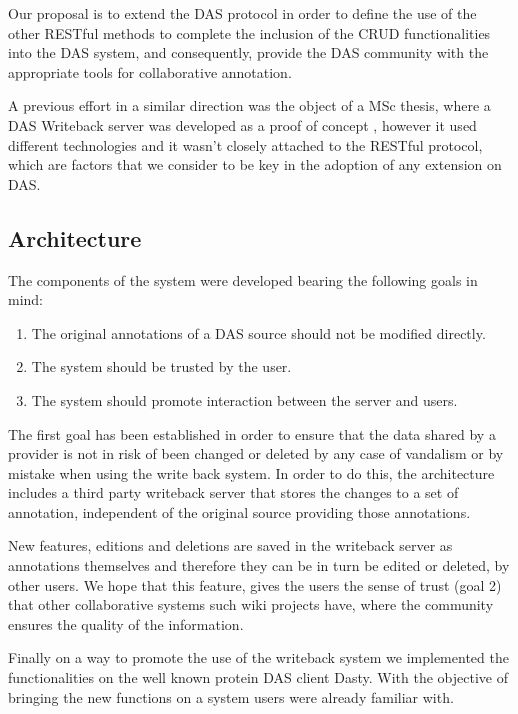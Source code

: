 Our proposal is to extend the DAS protocol in order to define the use of the other RESTful methods to complete the inclusion of the CRUD functionalities into the DAS system, and consequently, provide the DAS community with the appropriate tools for collaborative annotation.

A previous effort in a similar direction was the object of a MSc thesis, where a DAS Writeback server was developed as a proof of concept \cite{GRZ2008}, however it used different technologies and it wasn't closely attached to the RESTful protocol, which are factors that we consider to be key in the adoption of any extension on DAS.

\subsection{Architecture}
The components of the system were developed bearing the following goals in mind:
\begin{enumerate}
\setlength\itemsep{-0.5em}
\item The original annotations of a DAS source should not be modified directly.
\item The system should be trusted by the user.
\item The system should promote interaction between the server and users.
\end{enumerate}

The first goal has been established in order to ensure that the data shared by a provider is not in risk of been changed or deleted by any case of vandalism or by mistake when using the write back system. In order to do this, the architecture includes a third party writeback server that stores the changes to a set of annotation, independent of the original source providing those annotations. 

New features, editions and deletions are saved in the writeback server as annotations themselves and therefore they can be in turn be edited or deleted, by other users. We hope that this feature, gives the users the sense of trust (goal 2) that other collaborative systems such wiki projects have, where the community ensures the quality of the information. 

Finally on a way to promote the use of the writeback system we implemented the functionalities on the well known protein DAS client Dasty. With the objective of bringing the new functions on a system users were already familiar with.

